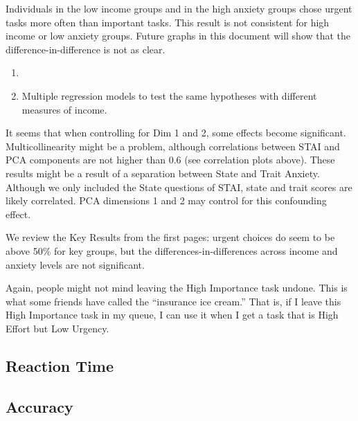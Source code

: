 \documentclass[
]{report}
\providecommand{\tightlist}{%
  \setlength{\itemsep}{0pt}\setlength{\parskip}{0pt}}\usepackage{longtable,booktabs,array}
\begin{document}
Individuals in the low income groups and in the high anxiety groups
chose urgent tasks more often than important tasks. This result is not
consistent for high income or low anxiety groups. Future graphs in this
document will show that the difference-in-difference is not as clear.

\begin{enumerate}
\def\labelenumi{\arabic{enumi}.}
\tightlist
\item
\item
  Multiple regression models to test the same hypotheses with different
  measures of income.
\end{enumerate}

\begin{table}

\end{table}

It seems that when controlling for Dim 1 and 2, some effects become
significant. Multicollinearity might be a problem, although correlations
between STAI and PCA components are not higher than 0.6 (see correlation
plots above). These results might be a result of a separation between
State and Trait Anxiety. Although we only included the State questions
of STAI, state and trait scores are likely correlated. PCA dimensions 1
and 2 may control for this confounding effect.

We review the Key Results from the first pages: urgent choices do seem
to be above 50\% for key groups, but the differences-in-differences
across income and anxiety levels are not significant.

Again, people might not mind leaving the High Importance task undone.
This is what some friends have called the ``insurance ice cream.'' That
is, if I leave this High Importance task in my queue, I can use it when
I get a task that is High Effort but Low Urgency.

\hypertarget{reaction-time}{%
\subsection{Reaction Time}\label{reaction-time}}

\begin{table}

\end{table}

\hypertarget{accuracy}{%
\subsection{Accuracy}\label{accuracy}}
\end{document}
